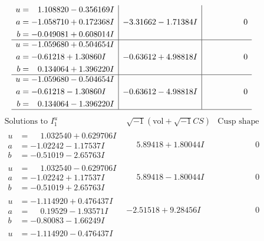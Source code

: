 \documentclass[1p]{elsarticle_modified}
\theoremstyle{definition}
\newcommand{\I}{\sqrt{-1}}
\begin{document}
$$\begin{array}{c|c|c}
\begin{aligned}
u &= \phantom{-}1.108820 - 0.356169 I \\
a &= -1.058710 + 0.172368 I \\
b &= -0.049081 + 0.608014 I\end{aligned}
 & -3.31662 - 1.71384 I & \phantom{-0.000000 } 0 \\ \hline\begin{aligned}
u &= -1.059680 + 0.504654 I \\
a &= -0.61218 + 1.30860 I \\
b &= \phantom{-}0.134064 + 1.396220 I\end{aligned}
 & -0.63612 + 4.98818 I & \phantom{-0.000000 } 0 \\ \hline\begin{aligned}
u &= -1.059680 - 0.504654 I \\
a &= -0.61218 - 1.30860 I \\
b &= \phantom{-}0.134064 - 1.396220 I\end{aligned}
 & -0.63612 - 4.98818 I & \phantom{-0.000000 } 0\\
 \hline 
 \end{array}$$\newpage$$\begin{array}{c|c|c}  
\text{Solutions to }I^u_{1}& \I (\text{vol} + \sqrt{-1}CS) & \text{Cusp shape}\\
 \hline 
\begin{aligned}
u &= \phantom{-}1.032540 + 0.629706 I \\
a &= -1.02242 - 1.17537 I \\
b &= -0.51019 - 2.65763 I\end{aligned}
 & \phantom{-}5.89418 + 1.80044 I & \phantom{-0.000000 } 0 \\ \hline\begin{aligned}
u &= \phantom{-}1.032540 - 0.629706 I \\
a &= -1.02242 + 1.17537 I \\
b &= -0.51019 + 2.65763 I\end{aligned}
 & \phantom{-}5.89418 - 1.80044 I & \phantom{-0.000000 } 0 \\ \hline\begin{aligned}
u &= -1.114920 + 0.476437 I \\
a &= \phantom{-}0.19529 - 1.93571 I \\
b &= -0.80083 - 1.66249 I\end{aligned}
 & -2.51518 + 9.28456 I & \phantom{-0.000000 } 0 \\ \hline\begin{aligned}
u &= -1.114920 - 0.476437 I \\

\end{aligned}
\end{array}$$
\end{document}
